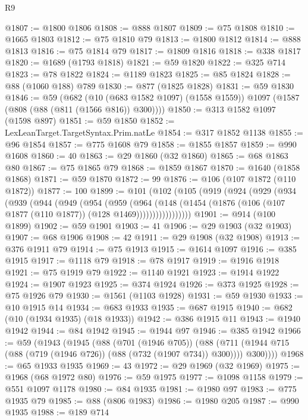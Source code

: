 \begin{lexlean}{R9}
\begin{coremodule}
@1807 := @1800 @1806
@1808 := @888 @1807
@1809 := @75 @1808
@1810 := @1665 @1803
@1812 := @75 @1810 @79
@1813 := @1800 @1812
@1814 := @888 @1813
@1816 := @75 @1814 @79
@1817 := @1809 @1816
@1818 := @338 @1817
@1820 := @1689 (@1793 @1818)
@1821 := @59 @1820
@1822 := @325 @714
@1823 := @78 @1822
@1824 := @1189 @1823
@1825 := @85 @1824
@1828 := @88 (@1060 @188) @789
@1830 := @877 (@1825 @1828)
@1831 := @59 @1830
@1846 := @59
    (@682
      (@10 (@683 @1582 @1097) (@1558 @1559))
      @1097
      (@1587 (@808 (@88 (@811 (@1566 @816)) @300))))
@1850 := @313 @1582 @1097 (@1598 @897)
@1851 := @59 @1850
@1852 := LexLeanTarget.TargetSyntax.Prim.natLe
@1854 := @317 @1852 @1138
@1855 := @96 @1854
@1857 := @775 @1608 @79
@1858 := @1855 @1857
@1859 := @990 @1608
@1860 := 40
@1863 := @29 @1860 (@32 @1860)
@1865 := @68 @1863 @80
@1867 := @75 @1865 @79
@1868 := @1859 @1867
@1870 := @1640 (@1858 @1868)
@1871 := @59 @1870
@1872 := 99
@1876 := @106 (@107 @1872 (@110 @1872))
@1877 := 100
@1899 := @101
    (@102
      (@105
        (@919
          (@924
            (@929
              (@934
                (@939
                  (@944
                    (@949
                      (@954
                        (@959
                          (@964
                            (@148
                              (@1454
                                (@1876 (@106 (@107 @1877 (@110 @1877)) (@128 @1469)))))))))))))))))
@1901 := @914 (@100 @1899)
@1902 := @59 @1901
@1903 := 41
@1906 := @29 @1903 (@32 @1903)
@1907 := @68 @1906
@1908 := 42
@1911 := @29 @1908 (@32 @1908)
@1913 := @376 @1911 @79
@1914 := @75 @1913
@1915 := @1614 @1097
@1916 := @385 @1915
@1917 := @1118 @79
@1918 := @78 @1917
@1919 := @1916 @1918
@1921 := @75 @1919 @79
@1922 := @1140 @1921
@1923 := @1914 @1922
@1924 := @1907 @1923
@1925 := @374 @1924
@1926 := @373 @1925
@1928 := @75 @1926 @79
@1930 := @1561 (@1103 @1928)
@1931 := @59 @1930
@1933 := @10 @1915 @14
@1934 := @683 @1933
@1935 := @687 @1915
@1940 := @682 (@10 (@1934 @1935) (@18 @1933))
@1942 := @386 @1915 @11
@1943 := @1940 @1942
@1944 := @84 @1942
@1945 := @1944 @97
@1946 := @385 @1942
@1966 := @59
    (@1943
      (@1945
        (@88
          (@701 (@1946 @705))
          (@88 (@711 (@1944 @715 (@88 (@719 (@1946 @726)) (@88 (@732 (@1907 @734)) @300)))) @300))))
@1968 := @65 @1933 @1935
@1969 := 43
@1972 := @29 @1969 (@32 @1969)
@1975 := @1968 (@68 @1972 @80)
@1976 := @59 @1975
@1977 := @1098 @1158
@1979 := @551 @1097 @1178
@1980 := @84 @1935
@1981 := @1980 @97
@1983 := @775 @1935 @79
@1985 := @88 (@806 @1983)
@1986 := @1980 @205
@1987 := @990 @1935
@1988 := @189 @714

\end{coremodule}
\end{lexlean}
